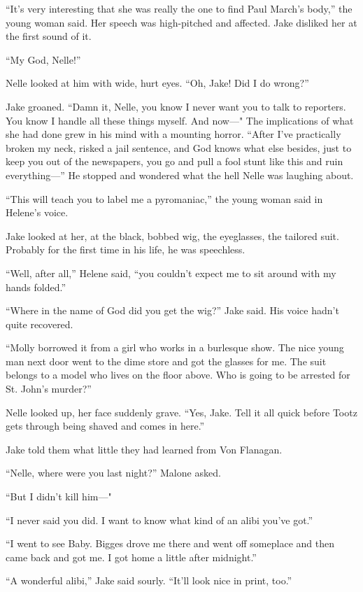 \documentclass{novel}
\begin{document}
“It’s very interesting that she was really the one to find Paul March’s body,” the young woman said. Her speech was high-pitched and affected. Jake disliked her at the first sound of it.

“My God, Nelle!”

Nelle looked at him with wide, hurt eyes. “Oh, Jake! Did I do wrong?”

Jake groaned. “Damn it, Nelle, you know I never want you to talk to reporters. You know I handle all these things myself. And now—" The implications of what she had done grew in his mind with a mounting horror. “After I’ve practically broken my neck, risked a jail sentence, and God knows what else besides, just to keep you out of the newspapers, you go and pull a fool stunt like this and ruin everything—” He stopped and wondered what the hell Nelle was laughing about.

“This will teach you to label me a pyromaniac,” the young woman said in Helene’s voice.

Jake looked at her, at the black, bobbed wig, the eyeglasses, the tailored suit. Probably for the first time in his life, he was speechless.

“Well, after all,” Helene said, “you couldn’t expect me to sit around with my hands folded.”

“Where in the name of God did you get the wig?” Jake said. His voice hadn’t quite recovered.

“Molly borrowed it from a girl who works in a burlesque show. The nice young man next door went to the dime store and got the glasses for me. The suit belongs to a model who lives on the floor above. Who is going to be arrested for St. John’s murder?”

Nelle looked up, her face suddenly grave. “Yes, Jake. Tell it all quick before Tootz gets through being shaved and comes in here.”

Jake told them what little they had learned from Von Flanagan.

“Nelle, where were you last night?” Malone asked.

“But I didn’t kill him—"

“I never said you did. I want to know what kind of an alibi you’ve got.”

“I went to see Baby. Bigges drove me there and went off someplace and then came back and got me. I got home a little after midnight.”

“A wonderful alibi,” Jake said sourly. “It’ll look nice in print, too.”
\end{document}

